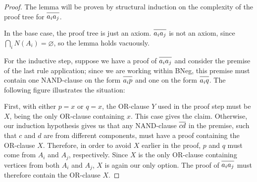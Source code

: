 \begin{proof}
  The lemma will be proven by structural induction on the complexity of the proof tree for $\ol{a_ia_j}$.

  In the base case, the proof tree is just an axiom.
  $\ol{a_ia_j}$ is not an axiom, since $\bigcap_i N(A_i) = \varnothing$, so the lemma holds vacuously.

  For the inductive step, suppose we have a proof of $\ol{a_ia_j}$ and consider the premise of the last rule application;
  since we are working within BNeg, this premise must contain one NAND-clause on the form $\ol{a_ip}$ and one on the form $\ol{a_iq}$.
  The following figure illustrates the situation:\par
  \begin{figure}[!h]
    \centering
    \begin{prooftree*}
      \Hypo{\dots}
      \Hypo{\dots}
      \Hypo{\dots}
    \end{prooftree*}
    \caption{}
    \label{fig:ab_proof_bc}
  \end{figure}
  \FloatBarrier
  First, with either $p = x$ or $q = x$, the OR-clause $Y$ used in the proof step must be $X$, being the only OR-clause containing $x$.
  This case gives the claim.
  Otherwise, our induction hypothesis gives us that any NAND-clause $\ol{cd}$ in the premise, such that $c$ and $d$ are from different components, must have a proof containing the OR-clause $X$.
  Therefore, in order to avoid $X$ earlier in the proof, $p$ and $q$ must come from $A_i$ and $A_j$, respectively.
  Since $X$ is the only OR-clause containing vertices from both $A_i$ and $A_j$, $X$ is again our only option.
  The proof of $\ol{a_ia_j}$ must therefore contain the OR-clause $X$.
\end{proof}

